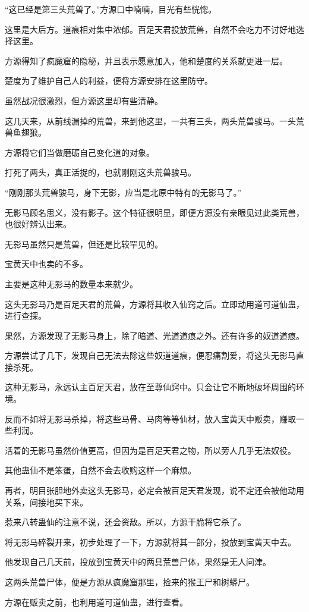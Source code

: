 \begin{this_body}
“这已经是第三头荒兽了。”方源口中喃喃，目光有些恍惚。

这里是大后方。道痕相对集中浓郁。百足天君投放荒兽，自然不会吃力不讨好地选择这里。

方源得知了疯魔窟的隐秘，并且表示愿意加入，他和楚度的关系就更进一层。

楚度为了维护自己人的利益，便将方源安排在这里防守。

虽然战况很激烈，但方源这里却有些清静。

这几天来，从前线漏掉的荒兽，来到他这里，一共有三头，两头荒兽骏马。一头荒兽鱼翅狼。

方源将它们当做磨砺自己变化道的对象。

打死了两头，真正活捉的，也就刚刚这头荒兽骏马。

“刚刚那头荒兽骏马，身下无影，应当是北原中特有的无影马了。”

无影马顾名思义，没有影子。这个特征很明显，即便方源没有亲眼见过此类荒兽，也很好辨认出来。

无影马虽然只是荒兽，但还是比较罕见的。

宝黄天中也卖的不多。

主要是这种无影马的数量本来就少。

这头无影马乃是百足天君的荒兽，方源将其收入仙窍之后。立即动用道可道仙蛊，进行查探。

果然，方源发现了无影马身上，除了暗道、光道道痕之外。还有许多的奴道道痕。

方源尝试了几下，发现自己无法去除这些奴道道痕，便忍痛割爱，将这头无影马直接杀死。

这种无影马，永远认主百足天君，放在至尊仙窍中。只会让它不断地破坏周围的环境。

反而不如将无影马杀掉，将这些马骨、马肉等等仙材，放入宝黄天中贩卖，赚取一些利润。

活着的无影马虽然价值更高，但因为是百足天君之物，所以旁人几乎无法奴役。

其他蛊仙不是笨蛋，自然不会去收购这样一个麻烦。

再者，明目张胆地外卖这头无影马，必定会被百足天君发现，说不定还会被他动用关系，间接地买下来。

惹来八转蛊仙的注意不说，还会资敌。所以，方源干脆将它杀了。

将无影马碎裂开来，初步处理了一下，方源就将其一部分，投放到宝黄天中去。

他发现自己几天前，投放到宝黄天中的两具荒兽尸体，果然是无人问津。

这两头荒兽尸体，便是方源从疯魔窟那里，捡来的猴王尸和树蟒尸。

方源在贩卖之前，也利用道可道仙蛊，进行查看。


\end{this_body}
